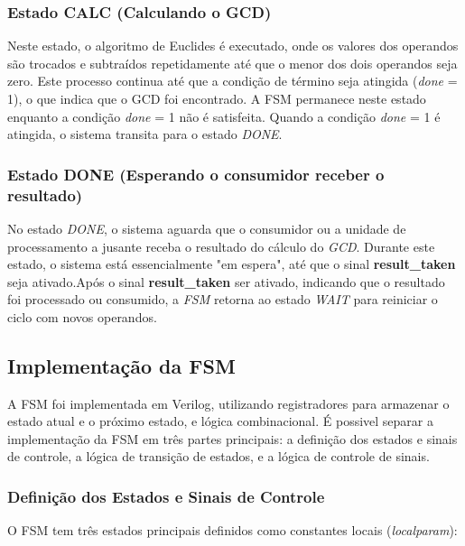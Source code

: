 \documentclass[a4paper,11pt]{article} %
\begin{document}
\subsubsection{Estado CALC (Calculando o GCD)}
Neste estado, o algoritmo de Euclides é executado, onde
os valores dos operandos são trocados e subtraídos
repetidamente até que o menor dos dois operandos seja zero.
Este processo continua até que a condição de término seja
atingida (\textit{done} = 1), o que indica que o GCD foi encontrado.
A FSM permanece neste estado enquanto a condição \textit{done} = 1
não é satisfeita. Quando a condição \textit{done} = 1 é atingida,
o sistema transita para o estado \textit{DONE}.

\subsubsection{Estado DONE (Esperando o consumidor receber o resultado)}
No estado \textit{DONE}, o sistema aguarda que o consumidor ou a
unidade de processamento a jusante receba o resultado do
cálculo do \textit{GCD}. Durante este estado, o sistema está
essencialmente "em espera", até que o sinal \textbf{result\_taken}
seja ativado.Após o sinal \textbf{result\_taken} ser ativado,
indicando que o resultado foi processado ou consumido,
a \textit{FSM} retorna ao estado \textit{WAIT} para reiniciar o ciclo
com novos operandos.


\subsection{Implementação da FSM}

A FSM foi implementada em Verilog, utilizando registradores
para armazenar o estado atual e o próximo estado, e lógica
combinacional. É possivel separar a implementação da FSM em
três partes principais: a definição dos estados e sinais de
controle, a lógica de transição de estados, e a lógica de
controle de sinais.

\subsubsection{Definição dos Estados e Sinais de Controle}
O FSM tem três estados principais definidos como constantes locais (\textit{localparam}):
\end{document}
